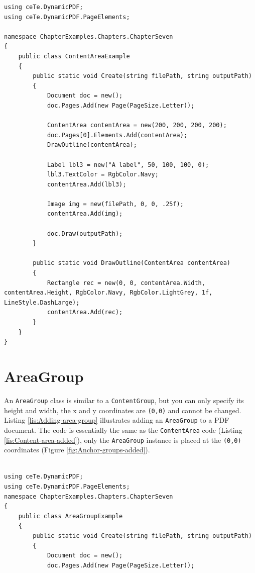 \documentclass[american]{tufte-book}
\numberwithin{equation}{section}
\numberwithin{figure}{section}
\begin{document}
{\begin{lstlisting}[caption={Content area added to PDF.},label={lis:Content-area-added},basicstyle={\footnotesize\ttfamily},breaklines=true]
using ceTe.DynamicPDF;
using ceTe.DynamicPDF.PageElements;

namespace ChapterExamples.Chapters.ChapterSeven
{
    public class ContentAreaExample
    {
        public static void Create(string filePath, string outputPath)
        {
            Document doc = new();
            doc.Pages.Add(new Page(PageSize.Letter));

            ContentArea contentArea = new(200, 200, 200, 200);
            doc.Pages[0].Elements.Add(contentArea);
            DrawOutline(contentArea);

            Label lbl3 = new("A label", 50, 100, 100, 0);
            lbl3.TextColor = RgbColor.Navy;
            contentArea.Add(lbl3);

            Image img = new(filePath, 0, 0, .25f);
            contentArea.Add(img);

            doc.Draw(outputPath);
        }

        public static void DrawOutline(ContentArea contentArea)
        {
            Rectangle rec = new(0, 0, contentArea.Width, contentArea.Height, RgbColor.Navy, RgbColor.LightGrey, 1f, LineStyle.DashLarge);
            contentArea.Add(rec);
        }
    }
}
\end{lstlisting}
\leavevmode\egroup


\section{AreaGroup}\label{subsec:AreaGroup}

An \texttt{AreaGroup} class is similar to a \texttt{ContentGroup},
but you can only specify its height and width, the x and y coordinates
are  \texttt{(0,0)} and cannot be changed. Listing \ref{lis:Adding-area-group} illustrates adding an \texttt{AreaGroup}
to a PDF document. The code is essentially the same as the \texttt{ContentArea}
code (Listing \ref{lis:Content-area-added}), only the \texttt{AreaGroup}
instance is placed at the \texttt{(0,0)} coordinates (Figure \ref{fig:Anchor-groups-added}).

\bgroup{}
\begin{lstlisting}[caption={Adding area group to a PDF.},label={lis:Adding-area-group},basicstyle={\footnotesize\ttfamily},breaklines=true]

using ceTe.DynamicPDF;
using ceTe.DynamicPDF.PageElements;
namespace ChapterExamples.Chapters.ChapterSeven
{
    public class AreaGroupExample
    {
        public static void Create(string filePath, string outputPath)
        {
            Document doc = new();
            doc.Pages.Add(new Page(PageSize.Letter));


\end{lstlisting}}
\end{document}

